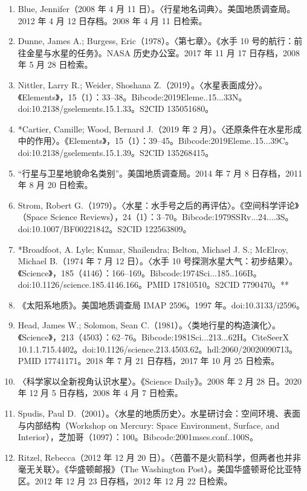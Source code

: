 \begin{enumerate}
    \item Blue, Jennifer（2008 年 4 月 11 日）。〈行星地名词典〉。美国地质调查局。2012 年 4 月 12 日存档。2008 年 4 月 11 日检索。
    \item Dunne, James A.; Burgess, Eric（1978）。〈第七章〉。《水手 10 号的航行：前往金星与水星的任务》。NASA 历史办公室。2017 年 11 月 17 日存档，2008 年 5 月 28 日检索。
    \item Nittler, Larry R.; Weider, Shoshana Z.（2019）。〈水星表面成分〉。《Elements》，15（1）：33–38。Bibcode:2019Eleme..15...33N。doi:10.2138/gselements.15.1.33。S2CID 135051680。
    \item *Cartier, Camille; Wood, Bernard J.（2019 年 2 月）。〈还原条件在水星形成中的作用〉。《Elements》，15（1）：39–45。Bibcode:2019Eleme..15...39C。doi:10.2138/gselements.15.1.39。S2CID 135268415。
    \item “行星与卫星地貌命名类别”。美国地质调查局。2014 年 7 月 8 日存档，2011 年 8 月 20 日检索。
    \item Strom, Robert G.（1979）。〈水星：水手号之后的再评估〉。《空间科学评论》（Space Science Reviews），24（1）：3–70。Bibcode:1979SSRv...24....3S。doi:10.1007/BF00221842。S2CID 122563809。
    \item *Broadfoot, A. Lyle; Kumar, Shailendra; Belton, Michael J. S.; McElroy, Michael B.（1974 年 7 月 12 日）。〈水手 10 号探测水星大气：初步结果〉。《Science》，185（4146）：166–169。Bibcode:1974Sci...185..166B。doi:10.1126/science.185.4146.166。PMID 17810510。S2CID 7790470。**
    \item 《太阳系地质》。美国地质调查局 IMAP 2596。1997 年。doi:10.3133/i2596。
    \item Head, James W.; Solomon, Sean C.（1981）。〈类地行星的构造演化〉。《Science》，213（4503）：62–76。Bibcode:1981Sci...213...62H。CiteSeerX 10.1.1.715.4402。doi:10.1126/science.213.4503.62。hdl:2060/20020090713。PMID 17741171。2018 年 7 月 21 日存档，2017 年 10 月 25 日检索。
    \item 〈科学家以全新视角认识水星〉。《Science Daily》。2008 年 2 月 28 日。2020 年 12 月 5 日存档，2008 年 4 月 7 日检索。
    \item Spudis, Paul D.（2001）。〈水星的地质历史〉。水星研讨会：空间环境、表面与内部结构（Workshop on Mercury: Space Environment, Surface, and Interior），芝加哥（1097）：100。Bibcode:2001mses.conf..100S。
    \item Ritzel, Rebecca（2012 年 12 月 20 日）。〈芭蕾不是火箭科学，但两者也并非毫无关联〉。《华盛顿邮报》（The Washington Post）。美国华盛顿哥伦比亚特区。2012 年 12 月 23 日存档，2012 年 12 月 22 日检索。

\end{enumerate}
